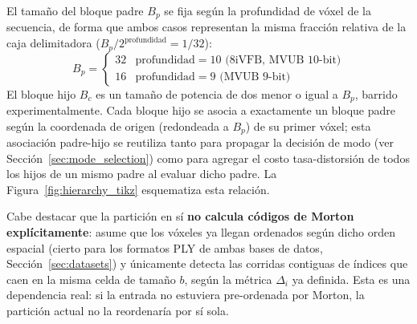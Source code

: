         El tamaño del bloque padre $B_p$ se fija según la profundidad de vóxel de la secuencia,
        de forma que ambos casos representan la misma fracción relativa de la caja delimitadora
        ($B_p / 2^{\text{profundidad}} = 1/32$):
        \begin{equation}
            B_p = \begin{cases} 32 & \text{profundidad} = 10 \text{ (8iVFB, MVUB 10-bit)} \\ 16 & \text{profundidad} = 9 \text{ (MVUB 9-bit)} \end{cases}
        \end{equation}
        El bloque hijo $B_c$ es un tamaño de potencia de dos menor o igual a $B_p$, barrido
        experimentalmente. Cada bloque hijo se asocia a exactamente un bloque padre según la
        coordenada de origen (redondeada a $B_p$) de su primer vóxel; esta asociación
        padre-hijo se reutiliza tanto para propagar la decisión de modo (ver
        Sección~\ref{sec:mode_selection}) como para agregar el costo tasa-distorsión de todos
        los hijos de un mismo padre al evaluar dicho padre. La Figura~\ref{fig:hierarchy_tikz} esquematiza esta relación.

        Cabe destacar que la partición en sí \textbf{no calcula códigos de Morton
        explícitamente}: asume que los vóxeles ya llegan ordenados según dicho orden espacial
        (cierto para los formatos PLY de ambas bases de datos, Sección~\ref{sec:datasets}) y
        únicamente detecta las corridas contiguas de índices que caen en la misma celda de
        tamaño $b$, según la métrica $\Delta_i$ ya definida. Esta es una dependencia real: si la
        entrada no estuviera pre-ordenada por Morton, la partición actual no la reordenaría por sí sola.

